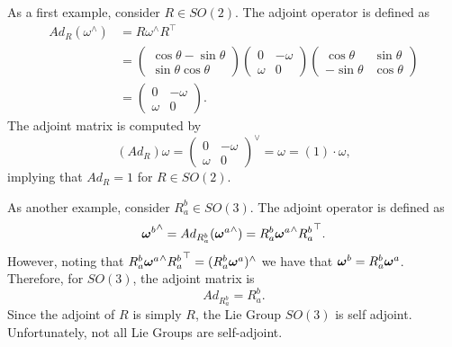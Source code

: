 As a first example, consider $R\in SO(2)$.  The adjoint operator is defined as
\begin{align*}
Ad_R(\omega^\wedge) 
	&= R\omega^\wedge R^\top \\
	&= \begin{pmatrix}\cos\theta -\sin\theta \\ \sin\theta \cos\theta \end{pmatrix} \begin{pmatrix} 0 & -\omega \\ \omega & 0 \end{pmatrix} \begin{pmatrix} \cos\theta & \sin\theta \\ -\sin\theta & \cos\theta \end{pmatrix} \\
	&= \begin{pmatrix} 0 & -\omega \\ \omega & 0 \end{pmatrix}.
\end{align*}
The adjoint matrix is computed by
\[
(Ad_R) \omega = \begin{pmatrix} 0 & -\omega \\ \omega & 0 \end{pmatrix}^\vee = \omega = (1) \cdot \omega,
\]
implying that $Ad_R = 1$ for $R\in SO(2)$.

As another example, consider $R_a^b\in SO(3)$.  The adjoint operator is defined as
\[
{\boldsymbol{\omega}^b}^\wedge = Ad_{R_a^b}({\boldsymbol{\omega}^a}^\wedge) = R_a^b {\boldsymbol{\omega}^a}^\wedge {R_a^b}^\top.
\]
However, noting that $R_a^b {\boldsymbol{\omega}^a}^\wedge {R_a^b}^\top = (R_a^b\boldsymbol{\omega}^a)^\wedge$ we have that 
$\boldsymbol{\omega}^b = R_a^b \boldsymbol{\omega}^a$.  Therefore, for $SO(3)$, the adjoint matrix is
\[
Ad_{R_a^b}=R_a^b.
\]
Since the adjoint of $R$ is simply $R$, the Lie Group $SO(3)$ is self adjoint.  Unfortunately, not all Lie Groups are self-adjoint.  

